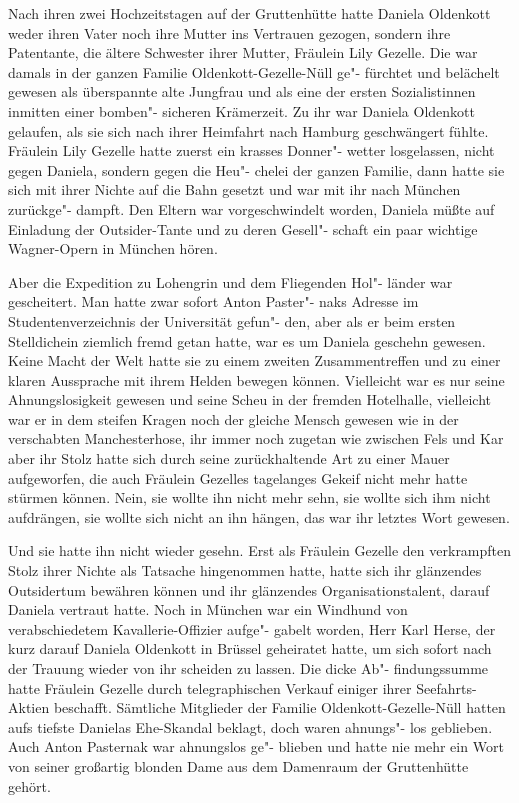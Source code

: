 Nach ihren zwei Hochzeitstagen auf der Gruttenhütte hatte
Daniela Oldenkott weder ihren Vater noch ihre Mutter ins
Vertrauen gezogen, sondern ihre Patentante, die ältere
Schwester ihrer Mutter, Fräulein Lily Gezelle. Die war
damals in der ganzen Familie Oldenkott-Gezelle-Nüll ge"-%
fürchtet und belächelt gewesen als überspannte alte Jungfrau
und als eine der ersten Sozialistinnen inmitten einer bomben"-%
sicheren Krämerzeit. Zu ihr war Daniela Oldenkott gelaufen,
als sie sich nach ihrer Heimfahrt nach Hamburg geschwängert
fühlte. Fräulein Lily Gezelle hatte zuerst ein krasses Donner"-%
wetter losgelassen, nicht gegen Daniela, sondern gegen die Heu"-%
chelei der ganzen Familie, dann hatte sie sich mit ihrer Nichte
auf die Bahn gesetzt und war mit ihr nach München zurückge"-%
dampft. Den Eltern war vorgeschwindelt worden, Daniela
müßte auf Einladung der Outsider-Tante und zu deren Gesell"-%
schaft ein paar wichtige Wagner-Opern in München hören.

Aber die Expedition zu Lohengrin und dem Fliegenden Hol"-%
länder war gescheitert. Man hatte zwar sofort Anton Paster"-%
naks Adresse im Studentenverzeichnis der Universität gefun"-%
den, aber als er beim ersten Stelldichein ziemlich fremd getan
hatte, war es um Daniela geschehn gewesen. Keine Macht der
Welt hatte sie zu einem zweiten Zusammentreffen und zu
einer klaren Aussprache mit ihrem Helden bewegen können.
Vielleicht war es nur seine Ahnungslosigkeit gewesen und seine
Scheu in der fremden Hotelhalle, vielleicht war er in dem
steifen Kragen noch der gleiche Mensch gewesen wie in der
verschabten Manchesterhose, ihr immer noch zugetan wie
zwischen Fels und Kar\dopp{} aber ihr Stolz hatte sich durch seine
zurückhaltende Art zu einer Mauer aufgeworfen, die auch
Fräulein Gezelles tagelanges Gekeif nicht mehr hatte stürmen
können. Nein, sie wollte ihn nicht mehr sehn, sie wollte sich
ihm nicht aufdrängen, sie wollte sich nicht an ihn hängen,
das war ihr letztes Wort gewesen.

Und sie hatte ihn nicht wieder gesehn. Erst als Fräulein
Gezelle den verkrampften Stolz ihrer Nichte als Tatsache
hingenommen hatte, hatte sich ihr glänzendes Outsidertum
bewähren können und ihr glänzendes Organisationstalent,
darauf Daniela vertraut hatte. Noch in München war ein
Windhund von verabschiedetem Kavallerie-Offizier aufge"-%
gabelt worden, Herr Karl Herse, der kurz darauf Daniela
Oldenkott in Brüssel geheiratet hatte, um sich sofort nach der
Trauung wieder von ihr scheiden zu lassen. Die dicke Ab"-%
findungssumme hatte Fräulein Gezelle durch telegraphischen
Verkauf einiger ihrer Seefahrts-Aktien beschafft. Sämtliche
Mitglieder der Familie Oldenkott-Gezelle-Nüll hatten aufs
tiefste Danielas Ehe-Skandal beklagt, doch waren ahnungs"-%
los geblieben. Auch Anton Pasternak war ahnungslos ge"-%
blieben und hatte nie mehr ein Wort von seiner großartig
blonden Dame aus dem Damenraum der Gruttenhütte
gehört.


